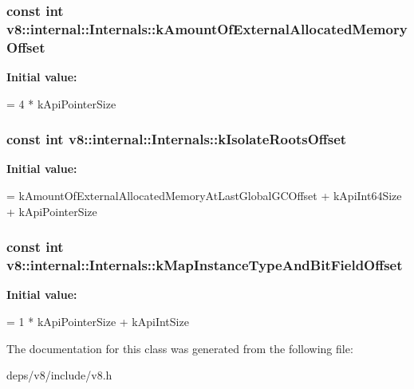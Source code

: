 \subsubsection[{k\+Amount\+Of\+External\+Allocated\+Memory\+Offset}]{\setlength{\rightskip}{0pt plus 5cm}const int v8\+::internal\+::\+Internals\+::k\+Amount\+Of\+External\+Allocated\+Memory\+Offset\hspace{0.3cm}{\ttfamily [static]}}\label{classv8_1_1internal_1_1_internals_a715b5e2c414c5efd35c5e01d4f2b9f85}
{\bfseries Initial value\+:}
\begin{DoxyCode}
=
      4 * kApiPointerSize
\end{DoxyCode}
\hypertarget{classv8_1_1internal_1_1_internals_a3142f942a25203ce7fca0e9a4563c74d}{}
\subsubsection[{k\+Isolate\+Roots\+Offset}]{\setlength{\rightskip}{0pt plus 5cm}const int v8\+::internal\+::\+Internals\+::k\+Isolate\+Roots\+Offset\hspace{0.3cm}{\ttfamily [static]}}\label{classv8_1_1internal_1_1_internals_a3142f942a25203ce7fca0e9a4563c74d}
{\bfseries Initial value\+:}
\begin{DoxyCode}
=
      kAmountOfExternalAllocatedMemoryAtLastGlobalGCOffset + kApiInt64Size +
      kApiPointerSize
\end{DoxyCode}
\hypertarget{classv8_1_1internal_1_1_internals_aeda3ec9bc2906bf6162b9cf3df9fd94a}{}
\subsubsection[{k\+Map\+Instance\+Type\+And\+Bit\+Field\+Offset}]{\setlength{\rightskip}{0pt plus 5cm}const int v8\+::internal\+::\+Internals\+::k\+Map\+Instance\+Type\+And\+Bit\+Field\+Offset\hspace{0.3cm}{\ttfamily [static]}}\label{classv8_1_1internal_1_1_internals_aeda3ec9bc2906bf6162b9cf3df9fd94a}
{\bfseries Initial value\+:}
\begin{DoxyCode}
=
      1 * kApiPointerSize + kApiIntSize
\end{DoxyCode}


The documentation for this class was generated from the following file\+:\begin{DoxyCompactItemize}
\item 
deps/v8/include/v8.\+h\end{DoxyCompactItemize}
